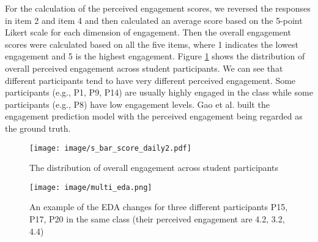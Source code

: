 \documentclass[sigconf]{acmart}
\begin{document}
For the calculation of the perceived engagement scores, we reversed the responses in item 2 and item 4 and then calculated an average score based on the 5-point Likert scale for each dimension of engagement. Then the overall engagement scores were calculated based on all the five items, where 1 indicates the lowest engagement and 5 is the highest engagement. Figure \ref{fig:dis_engage} shows the distribution of overall perceived engagement across student participants. We can see that different participants tend to have very different perceived engagement. Some participants (e.g., P1, P9, P14) are usually highly engaged in the class while some participants (e.g., P8) have low engagement levels. Gao et al. \cite{gao2020n} built the engagement prediction model with the perceived engagement being regarded as the ground truth.

\begin{figure}
    \centering
    \texttt{[image: image/s\_bar\_score\_daily2.pdf]}
    \caption{The distribution of overall engagement across student participants}
    \label{fig:dis_engage}
\end{figure}





\begin{figure}
    \centering
    \texttt{[image: image/multi\_eda.png]}
    \caption{An example of the EDA changes for three different participants P15, P17, P20 in the same class (their perceived engagement are 4.2, 3.2, 4.4)}
    \label{fig:multi_eda}
\end{figure}

\begin{comment}
\begin{figure*}
    \centering
    \texttt{[image: image/course\_anno.pdf]}
    \caption{The impact of course subjects on the perceived self-report engagement}
    \label{fig:impact_subject_anno}
\end{figure*}
\begin{figure*}
    \centering
    \texttt{[image: image/course\_e4.pdf]}
    \caption{The impact of course subjects on the physiological-measured engagement}
    \label{fig:impact_subject}
\end{figure*}

\end{comment}
\end{document}
